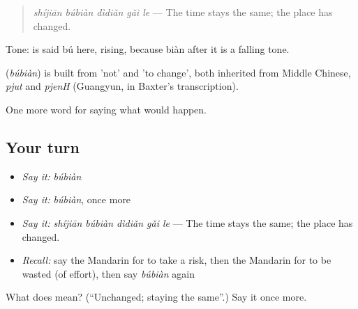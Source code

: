 \begin{quote}
\textbf{} \emph{shíjiān búbiàn dìdiǎn gǎi le} — The time stays the same; the place has changed.
\end{quote}

Tone:  is said bú here, rising, because biàn after it is a falling tone.

\begin{cousinweb}
\textbf{} (\emph{búbiàn}) is built from  'not' and  'to change', both inherited from Middle Chinese, \emph{pjut} and \emph{pjenH} (Guangyun, in Baxter's transcription).
\end{cousinweb}

\begin{grammarlens}[title={What you've built}]
One more word for saying what would happen.
\end{grammarlens}

\subsection*{Your turn}
\begin{itemize}
\raggedright
  \item \emph{Say it:} \emph{búbiàn}
  \item \emph{Say it:} \emph{búbiàn}, once more
  \item \emph{Say it:} \emph{shíjiān búbiàn dìdiǎn gǎi le} — The time stays the same; the place has changed.
  \item \emph{Recall:} say the Mandarin for to take a risk, then the Mandarin for to be wasted (of effort), then say \emph{búbiàn} again
\end{itemize}

\begin{tcolorbox}[breakable,colback=teal!4,colframe=teal!35!black,title={Before you move on}]
What does  mean? (\textquotedblleft{}Unchanged; staying the same\textquotedblright{}.) Say it once more.
\end{tcolorbox}
